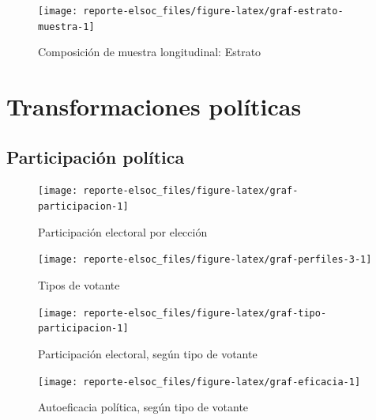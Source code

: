 \documentclass[
  12pt,
]{book}
\begin{document}
\begin{figure}

{\centering \texttt{[image: reporte-elsoc\_files/figure-latex/graf-estrato-muestra-1]} 

}

\caption{Composición de muestra longitudinal: Estrato}\label{fig:graf-estrato-muestra}
\end{figure}

\hypertarget{transformaciones-poluxedticas}{%
\chapter{Transformaciones políticas}\label{transformaciones-poluxedticas}}

\hypertarget{participaciuxf3n-poluxedtica}{%
\section{Participación política}\label{participaciuxf3n-poluxedtica}}

\begin{figure}

{\centering \texttt{[image: reporte-elsoc\_files/figure-latex/graf-participacion-1]} 

}

\caption{Participación electoral por elección}\label{fig:graf-participacion}
\end{figure}

\begin{figure}

{\centering \texttt{[image: reporte-elsoc\_files/figure-latex/graf-perfiles-3-1]} 

}

\caption{Tipos de votante}\label{fig:graf-perfiles-3}
\end{figure}

\begin{figure}

{\centering \texttt{[image: reporte-elsoc\_files/figure-latex/graf-tipo-participacion-1]} 

}

\caption{Participación electoral, según tipo de votante}\label{fig:graf-tipo-participacion}
\end{figure}

\begin{figure}

{\centering \texttt{[image: reporte-elsoc\_files/figure-latex/graf-eficacia-1]} 

}

\caption{Autoeficacia política, según tipo de votante}\label{fig:graf-eficacia}
\end{figure}
\end{document}
